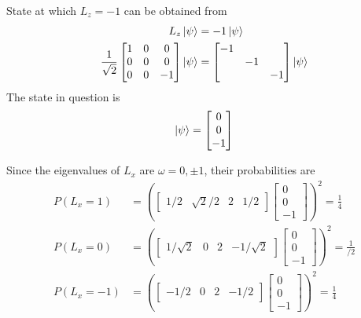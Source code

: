\documentclass[../../../main.tex]{subfiles}
\begin{document}
State at which $L_z=-1$ can be obtained from
\begin{align*}
    L_z \ket{\psi} & =-  1 \ket{\psi} \\
    \frac{1 }{\sqrt{2 }}\begin{bmatrix}
                            1 & 0 & 0  \\
                            0 & 0 & 0  \\
                            0 & 0 & -1 \\
                        \end{bmatrix}
    \ket{\psi}     & =
    \begin{bmatrix}
        -1 &    &    \\
           & -1 &    \\
           &    & -1 \\
    \end{bmatrix}
    \ket{\psi}
\end{align*}
The state in question is
\begin{equation*}
    \ket{\psi}=
    \begin{bmatrix}
        0 \\0\\-1\\
    \end{bmatrix}
\end{equation*}

Since the eigenvalues of $L_x$ are $\omega=0,\pm 1$, their probabilities are
\begin{align*}
    P(L_x=1)  & = \left(
    \begin{bmatrix}
            1/2 & \sqrt{2}/2 & 2 & 1/2
        \end{bmatrix}
    \begin{bmatrix}
            0 \\0\\-1
        \end{bmatrix}
    \right) ^2=\frac{1 }{4}  \\
    P(L_x=0)  & = \left(
    \begin{bmatrix}
            1/\sqrt{2} & 0 & 2 & -1/\sqrt{2}
        \end{bmatrix}
    \begin{bmatrix}
            0 \\0\\-1
        \end{bmatrix}
    \right) ^2=\frac{1 }{/2} \\
    P(L_x=-1) & = \left(
    \begin{bmatrix}
            -1/2 & 0 & 2 & -1/2
        \end{bmatrix}
    \begin{bmatrix}
            0 \\0\\-1
        \end{bmatrix}
    \right) ^2=\frac{1 }{4}  \\
\end{align*}
\end{document}
